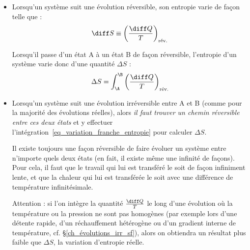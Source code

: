 		\begin{itemize}
			\item Lorsqu’un système suit une évolution réversible, son entropie varie de façon telle que :
				\begin{equation}
					\diff S \equiv  \left( \frac{\diff Q}{T} \right)_\text{rév.}
					\label{def_entropie}
				\end{equation}
				{\small%
				}

				Lorsqu’il passe d’un état A à un état B de façon réversible, l’entropie d’un système varie donc d’une quantité $\Delta S$ :	
				\begin{equation}
					\Delta S = \int_\A^\B \left( \frac{\diff Q}{T} \right)_\text{rév.}
					\label{eq_variation_franche_entropie}
				\end{equation}

			\item Lorsqu’un système suit une évolution irréversible entre A et B (comme pour la majorité des évolutions réelles), alors \emph{il faut trouver un chemin réversible entre ces deux états} et y effectuer l’intégration~\ref{eq_variation_franche_entropie} pour calculer $\Delta S$. 

				Il existe toujours une façon réversible de faire évoluer un système entre n’importe quels deux états (en fait, il existe même une infinité de façons). Pour cela, il faut que le travail qui lui est transféré le soit de façon infiniment lente, et que la chaleur qui lui est transférée le soit avec une différence de température infinitésimale.
				
				Attention : si l’on intègre la quantité $\frac{\diff Q}{T}$ le long d’une évolution où la température ou la pression ne sont pas homogènes (par exemple lors d’une détente rapide, d’un réchauffement hétérogène ou d’un gradient interne de température, cf. \S\ref{ch_évolutions_irr_sf}), alors on obtiendra un résultat plus faible que $\Delta S$, la variation d’entropie réelle. 
				
			\end{itemize}



